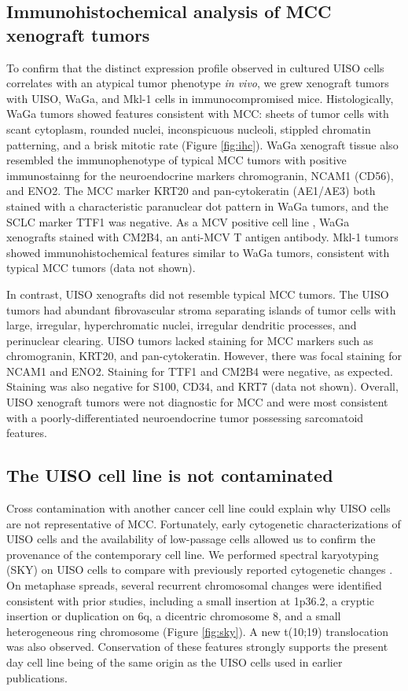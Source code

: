 \documentclass[10pt]{article}
\begin{document}
\subsection*{Immunohistochemical analysis of MCC xenograft tumors}
To confirm that the distinct expression profile observed in cultured UISO cells correlates with an atypical tumor phenotype \emph{in vivo}, we grew xenograft tumors with UISO, WaGa, and Mkl-1 cells in immunocompromised mice.
Histologically, WaGa tumors showed features consistent with MCC: sheets of tumor cells with scant cytoplasm, rounded nuclei, inconspicuous nucleoli, stippled chromatin patterning, and a brisk mitotic rate (Figure \ref{fig:ihc}).
WaGa xenograft tissue also resembled the immunophenotype of typical MCC tumors with positive immunostainng for the neuroendocrine markers chromogranin, NCAM1 (CD56), and ENO2.
The MCC marker KRT20 and pan-cytokeratin (AE1/AE3) both stained with a characteristic paranuclear dot pattern in WaGa tumors, and the SCLC marker TTF1 was negative.
As a MCV positive cell line \citep{Houben2010Merkel}, WaGa xenografts stained with CM2B4, an anti-MCV T antigen antibody.
Mkl-1 tumors showed immunohistochemical features similar to WaGa tumors, consistent with typical MCC tumors (data not shown).

In contrast, UISO xenografts did not resemble typical MCC tumors.
The UISO tumors had abundant fibrovascular stroma separating islands of tumor cells with large, irregular, hyperchromatic nuclei, irregular dendritic processes, and perinuclear clearing.
UISO tumors lacked staining for MCC markers such as chromogranin, KRT20, and pan-cytokeratin.
However, there was focal staining for NCAM1 and ENO2.
Staining for TTF1 and CM2B4 were negative, as expected.
Staining was also negative for S100, CD34, and KRT7 (data not shown).
Overall, UISO xenograft tumors were not diagnostic for MCC and were most consistent with a poorly-differentiated neuroendocrine tumor possessing sarcomatoid features.

\subsection*{The UISO cell line is not contaminated}
Cross contamination with another cancer cell line could explain why UISO cells are not representative of MCC.
Fortunately, early cytogenetic characterizations of UISO cells and the availability of low-passage cells allowed us to confirm the provenance of the contemporary cell line.
We performed spectral karyotyping (SKY) on UISO cells to compare with previously reported cytogenetic changes \citep{VanGele2002Combined,VanGele1998Characteristic}.
On metaphase spreads, several recurrent chromosomal changes were identified consistent with prior studies, including a small insertion at 1p36.2, a cryptic insertion or duplication on 6q, a dicentric chromosome 8, and a small heterogeneous ring chromosome (Figure \ref{fig:sky}).
A new t(10;19) translocation was also observed.
Conservation of these features strongly supports the present day cell line being of the same origin as the UISO cells used in earlier publications.
\end{document}

